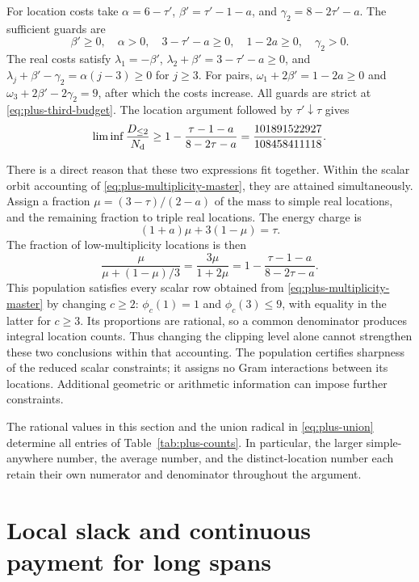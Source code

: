 \documentclass[11pt,reqno]{amsart}
\numberwithin{equation}{section}
\begin{document}
For location costs take $\alpha=6-\tau'$,
$\beta'=\tau'-1-a$, and $\gamma_2=8-2\tau'-a$.
The sufficient guards are
\[
 \beta'\ge0,\quad\alpha>0,\quad
 3-\tau'-a\ge0,\quad1-2a\ge0,\quad\gamma_2>0.
\]
The real costs satisfy $\lambda_1=-\beta'$,
$\lambda_2+\beta'=3-\tau'-a\ge0$, and
$\lambda_j+\beta'-\gamma_2=\alpha(j-3)\ge0$ for $j\ge3$.
For pairs, $\omega_1+2\beta'=1-2a\ge0$ and
$\omega_3+2\beta'-2\gamma_2=9$, after which the costs increase.
All guards are strict at \eqref{eq:plus-third-budget}. The location
argument followed by $\tau'\downarrow\tau$ gives
\begin{equation}
 \liminf\frac{D_{\le2}}{N_{\rm d}}
 \ge1-\frac{\tau-1-a}{8-2\tau-a}
 =\frac{101891522927}{108458411118}.
 \label{eq:plus-locations-two}
\end{equation}

There is a direct reason that these two expressions fit together.
Within the scalar orbit accounting of
\eqref{eq:plus-multiplicity-master}, they are attained simultaneously.
Assign a fraction
$\mu=(3-\tau)/(2-a)$ of the mass to simple real locations, and
the remaining fraction to triple real locations. The energy charge
is
\[
 (1+a)\mu+3(1-\mu)=\tau.
\]
The fraction of low-multiplicity locations is then
\[
 \frac{\mu}{\mu+(1-\mu)/3}
 =\frac{3\mu}{1+2\mu}
 =1-\frac{\tau-1-a}{8-2\tau-a}.
\]
This population satisfies every scalar row obtained from
\eqref{eq:plus-multiplicity-master} by changing $c\ge2$:
$\phi_c(1)=1$ and $\phi_c(3)\le9$, with equality in the latter
for $c\ge3$. Its proportions are rational, so a common denominator
produces integral location counts. Thus changing the clipping level
alone cannot strengthen these two conclusions within that accounting.
The population certifies sharpness of the reduced scalar constraints;
it assigns no Gram interactions between its locations. Additional
geometric or arithmetic information can impose further constraints.

The rational values in this section and the union radical in
\eqref{eq:plus-union} determine all entries of
Table~\ref{tab:plus-counts}. In particular, the larger simple-anywhere
number, the average number, and the distinct-location number each
retain their own numerator and denominator throughout the argument.


\section{Local slack and continuous payment for long spans}
\label{sec:rigidity}
\end{document}

